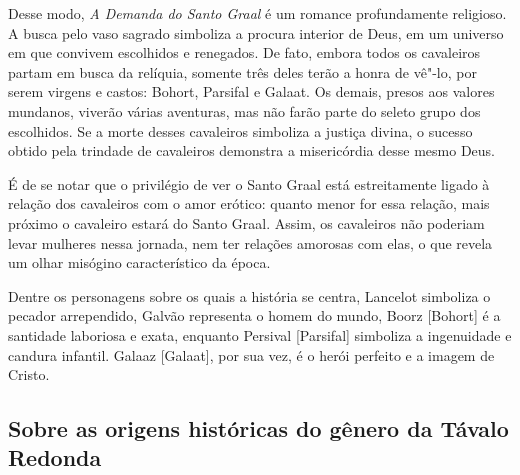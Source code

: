 Desse modo, \emph{A Demanda do Santo Graal} é
um romance profundamente religioso. A busca pelo vaso sagrado simboliza
a procura interior de Deus, em um universo em que convivem escolhidos e
renegados. De fato, embora todos os cavaleiros partam em busca da
relíquia, somente três deles terão a honra de vê"-lo, por serem virgens e
castos: Bohort, Parsifal e Galaat. Os demais, presos aos valores
mundanos, viverão várias aventuras, mas não farão parte do seleto grupo
dos escolhidos. Se a morte desses cavaleiros simboliza a justiça divina,
o sucesso obtido pela trindade de cavaleiros demonstra a misericórdia
desse mesmo Deus.

É de se notar que o privilégio de ver o Santo Graal está
estreitamente ligado à relação dos cavaleiros com o amor erótico: quanto
menor for essa relação, mais próximo o cavaleiro estará do Santo Graal.
Assim, os cavaleiros não poderiam levar mulheres nessa jornada, nem ter
relações amorosas com elas, o que revela um olhar misógino
característico da época.

Dentre os personagens sobre os quais a história se centra,
Lancelot simboliza o pecador arrependido, Galvão representa o homem do
mundo, Boorz {[}Bohort{]} é a santidade laboriosa e exata, enquanto
Persival {[}Parsifal{]} simboliza a ingenuidade e candura infantil.
Galaaz {[}Galaat{]}, por sua vez, é o herói perfeito e a imagem de
Cristo.


\subsection{Sobre as origens históricas do gênero da Távalo Redonda}

